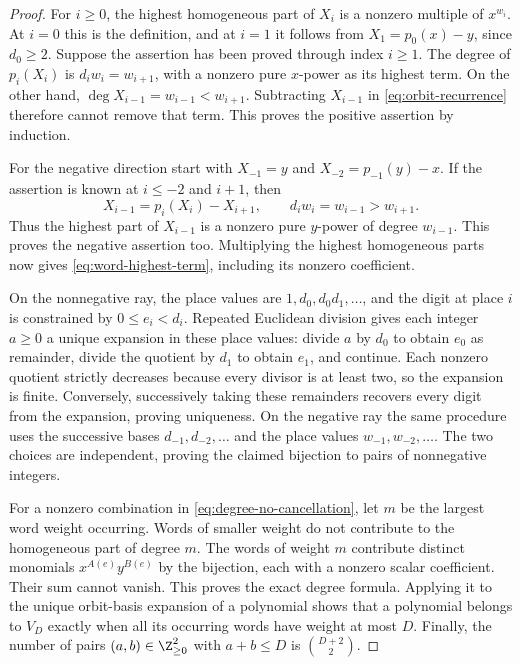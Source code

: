 \begin{proof}
For $i\ge0$, the highest homogeneous part of $X_i$ is a nonzero
multiple of $x^{w_i}$.  At $i=0$ this is the definition, and at $i=1$
it follows from $X_1=p_0(x)-y$, since $d_0\ge2$.
Suppose the assertion has been proved through index $i\ge1$.
The degree of $p_i(X_i)$ is $d_iw_i=w_{i+1}$, with a nonzero pure
$x$-power as its highest term.  On the other hand,
$\deg X_{i-1}=w_{i-1}<w_{i+1}$.  Subtracting $X_{i-1}$ in
\eqref{eq:orbit-recurrence} therefore cannot remove that term.
This proves the positive assertion by induction.

For the negative direction start with $X_{-1}=y$ and
$X_{-2}=p_{-1}(y)-x$.  If the assertion is known at $i\le-2$ and
$i+1$, then
\[
  X_{i-1}=p_i(X_i)-X_{i+1},\qquad
  d_iw_i=w_{i-1}>w_{i+1}.
\]
Thus the highest part of $X_{i-1}$ is a nonzero pure $y$-power of
degree $w_{i-1}$.  This proves the negative assertion too.
Multiplying the highest homogeneous parts now gives
\eqref{eq:word-highest-term}, including its nonzero coefficient.

On the nonnegative ray, the place values are
$1,d_0,d_0d_1,\ldots$, and the digit at place $i$ is constrained by
$0\le e_i<d_i$.  Repeated Euclidean division gives each integer
$a\ge0$ a unique expansion in these place values: divide $a$ by
$d_0$ to obtain $e_0$ as remainder, divide the quotient by $d_1$
to obtain $e_1$, and continue.  Each nonzero quotient strictly
decreases because every divisor is at least two, so the expansion
is finite.  Conversely, successively taking these remainders recovers
every digit from the expansion, proving uniqueness.  On the negative
ray the same procedure uses the successive bases
$d_{-1},d_{-2},\ldots$ and the place values
$w_{-1},w_{-2},\ldots$.  The two choices are independent, proving
the claimed bijection to pairs of nonnegative integers.

For a nonzero combination in \eqref{eq:degree-no-cancellation}, let
$m$ be the largest word weight occurring.  Words of smaller weight
do not contribute to the homogeneous part of degree $m$.
The words of weight $m$ contribute distinct monomials $x^{A(e)}y^{B(e)}$
by the bijection, each with a nonzero scalar coefficient.  Their sum
cannot vanish.  This proves the exact degree formula.  Applying it
to the unique orbit-basis expansion of a polynomial shows that a
polynomial belongs to $V_D$ exactly when all its occurring words
have weight at most $D$.  Finally, the number of pairs
$(a,b)\in\Z_{\ge0}^2$ with $a+b\le D$ is $\binom{D+2}{2}$.
\end{proof}

